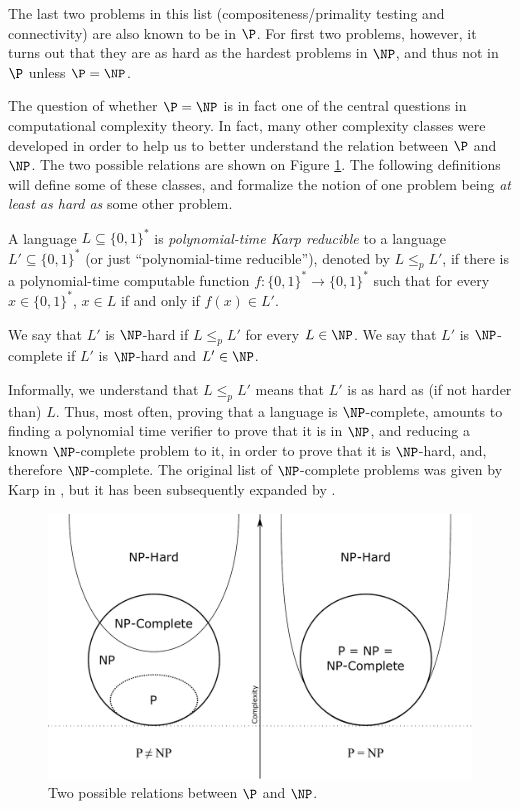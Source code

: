 \documentclass[12pt,a4paper,titlepage,openany]{report}
\begin{document}
The last two problems in this list (compositeness/primality testing and connectivity) are also known to be in $\P$. For first two problems, however, it turns out that they are as hard as the hardest problems in $\NP$, and thus not in $\P$ unless $\P = \NP$.

The question of whether $\P = \NP$ is in fact one of the central questions in computational complexity theory. In fact, many other complexity classes were developed in order to help us to better understand the relation between $\P$ and $\NP$. The two possible relations are shown on Figure \ref{fig: P vs NP}. The following definitions will define some of these classes, and formalize the notion of one problem being \emph{at least as hard as} some other problem.

\begin{definition}
	A language $L \subseteq \{0, 1\}^*$ is \emph{polynomial-time Karp reducible} to a language $L'\subseteq \{0, 1\}^*$ (or just ``polynomial-time reducible''), denoted by $L \leq_p L'$, if there is
	a polynomial-time computable function $f : \{0, 1\}^* \to \{0, 1\}^*$ such that for every
	$x \in \{0, 1\}^*$, $x\in L$ if and only if $f(x) \in L'$.
	
	We say that $L'$ is $\NP$-hard if $L \leq_p L'$ for every $L \in \NP$. We say that $L'$ is
	$\NP$-complete if $L'$ is $\NP$-hard and $L' \in \NP$.
\end{definition}

Informally, we understand that $L \leq_p L'$ means that $L'$ is as hard as (if not harder than) $L$. 
Thus, most often, proving that a language is $\NP$-complete, amounts to finding a polynomial time verifier to prove that it is in $\NP$, and reducing a known $\NP$-complete problem to it, in order to prove that it is $\NP$-hard, and, therefore $\NP$-complete. The original list of $\NP$-complete problems was given by Karp in \cite{karp1972reducibility}, but it has been subsequently expanded by \cite{gary1979computers}.

\begin{figure}[h]
	\centering
	\includegraphics[width=0.8\linewidth]{P_vs_NP}
	\caption{Two possible relations between $\P$ and $\NP$.}
	\label{fig: P vs NP}
\end{figure}
\end{document}
